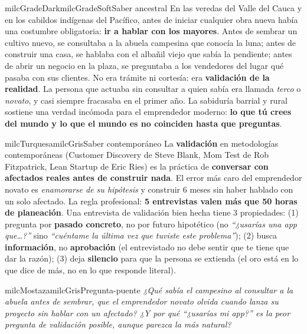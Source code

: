 \documentclass[11pt,letterpaper]{article}
\begin{document}
\begin{softbox}{milcGradeDark}{milcGradeSoft}{Saber ancestral}
En las veredas del Valle del Cauca y en los cabildos indígenas del Pacífico, antes de iniciar cualquier obra nueva había una costumbre obligatoria: \textbf{ir a hablar con los mayores}. Antes de sembrar un cultivo nuevo, se consultaba a la abuela campesina que conocía la luna; antes de construir una casa, se hablaba con el albañil viejo que sabía la pendiente; antes de abrir un negocio en la plaza, se preguntaba a los vendedores del lugar qué pasaba con sus clientes. No era trámite ni cortesía: era \textbf{validación de la realidad}. La persona que actuaba sin consultar a quien sabía era llamada \emph{terco} o \emph{novato}, y casi siempre fracasaba en el primer año. La sabiduría barrial y rural sostiene una verdad incómoda para el emprendedor moderno: \textbf{lo que tú crees del mundo y lo que el mundo es no coinciden hasta que preguntas}.
\end{softbox}

\begin{softbox}{milcTurquesa}{milcGris}{Saber contemporáneo}
La \textbf{validación} en metodologías contemporáneas (Customer Discovery de Steve Blank, Mom Test de Rob Fitzpatrick, Lean Startup de Eric Ries) es la práctica de \textbf{conversar con afectados reales antes de construir nada}. El error más caro del emprendedor novato es \emph{enamorarse de su hipótesis} y construir 6 meses sin haber hablado con un solo afectado. La regla profesional: \textbf{5 entrevistas valen más que 50 horas de planeación}. Una entrevista de validación bien hecha tiene 3 propiedades: (1) pregunta por \textbf{pasado concreto}, no por futuro hipotético (no \emph{``¿usarías una app que…?''} sino \emph{``cuéntame la última vez que tuviste este problema''}); (2) busca \textbf{información}, no \textbf{aprobación} (el entrevistado no debe sentir que te tiene que dar la razón); (3) deja \textbf{silencio} para que la persona se extienda (el oro está en lo que dice de más, no en lo que responde literal).
\end{softbox}

\begin{softbox}{milcMostaza}{milcGris}{Pregunta-puente}
\textit{¿Qué sabía el campesino al consultar a la abuela antes de sembrar, que el emprendedor novato olvida cuando lanza su proyecto sin hablar con un afectado? ¿Y por qué \emph{``¿usarías mi app?''} es la peor pregunta de validación posible, aunque parezca la más natural?}
\end{softbox}
\end{document}
